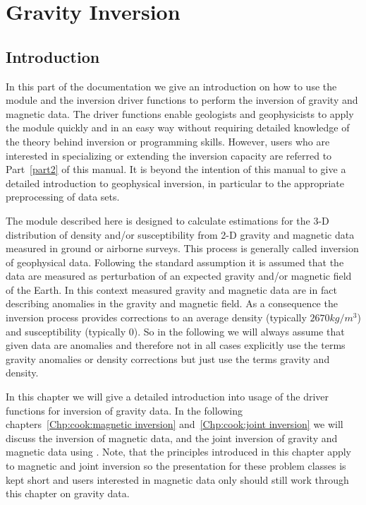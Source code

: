 \chapter{Gravity Inversion}\label{Chp:cook:gravity inversion}

\section{Introduction}

In this part of the documentation we give an introduction on how to use the
\downunder module and the inversion driver functions to perform the inversion
of gravity and magnetic data.
The driver functions enable geologists and geophysicists to apply the
\downunder module quickly and in an easy way without requiring detailed
knowledge of the theory behind inversion or programming skills.
However, users who are interested in specializing or extending the inversion
capacity are referred to Part~\ref{part2} of this manual.
It is beyond the intention of this manual to give a detailed introduction to
geophysical inversion, in particular to the appropriate preprocessing of data
sets.

The \downunder module described here is designed to calculate estimations for
the 3-D distribution of density and/or susceptibility from 2-D gravity and
magnetic data measured in ground or airborne surveys.
This process is generally called inversion of geophysical data.
Following the standard assumption it is assumed that the data are measured as
perturbation of an expected gravity and/or magnetic field of the Earth.
In this context measured gravity and magnetic data are in fact describing
anomalies in the gravity and magnetic field.
As a consequence the inversion process provides corrections to an average
density (typically $2670 kg/m^3$) and susceptibility (typically $0$).
So in the following we will always assume that given data are anomalies and
therefore not in all cases explicitly use the terms gravity anomalies or
density corrections but just use the terms gravity and density.

In this chapter we will give a detailed introduction into usage of the driver
functions for inversion of gravity data.
In the following chapters~\ref{Chp:cook:magnetic inversion} and~\ref{Chp:cook:joint inversion}
we will discuss the inversion of magnetic data, and the joint inversion of
gravity and magnetic data using \downunder.
Note, that the principles introduced in this chapter apply to magnetic and
joint inversion so the presentation for these problem classes is kept short
and users interested in magnetic data only should still work through this
chapter on gravity data. 

